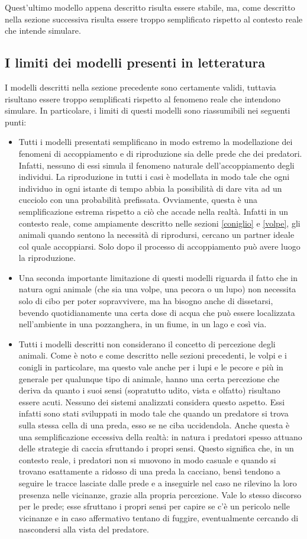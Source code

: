 \documentclass[11pt]{article}
\begin{document}
Quest'ultimo modello appena descritto risulta essere stabile, ma, come descritto nella sezione successiva risulta essere troppo semplificato rispetto al contesto reale che intende simulare. 

\subsection{I limiti dei modelli presenti in letteratura}
I modelli descritti nella sezione precedente sono certamente validi, tuttavia risultano essere troppo semplificati rispetto al fenomeno reale che intendono simulare. 
In particolare, i limiti di questi modelli sono riassumibili nei seguenti punti:
\begin{itemize}
    \item Tutti i modelli presentati semplificano in modo estremo la modellazione dei fenomeni di accoppiamento e di riproduzione sia delle prede che dei predatori. Infatti, nessuno di essi simula il fenomeno naturale dell'accoppiamento degli individui. La riproduzione in tutti i casi è modellata in modo tale che ogni individuo in ogni istante di tempo abbia la possibilità di dare vita ad un cucciolo con una probabilità prefissata. Ovviamente, questa è una semplificazione estrema rispetto a ciò che accade nella realtà. Infatti in un contesto reale, come ampiamente descritto nelle sezioni \ref{coniglio} e \ref{volpe}, gli animali quando sentono la necessità di riprodursi, cercano un partner ideale col quale accoppiarsi. Solo dopo il processo di accoppiamento può avere luogo la riproduzione. 
    \item Una seconda importante limitazione di questi modelli riguarda il fatto che in natura ogni animale (che sia una volpe, una pecora o un lupo) non necessita solo di cibo per poter sopravvivere, ma ha bisogno anche di dissetarsi, bevendo quotidianamente una certa dose di acqua che può essere localizzata nell'ambiente in una pozzanghera, in un fiume, in un lago e così via.
    \item Tutti i modelli descritti non considerano il concetto di percezione degli animali. Come è noto e come descritto nelle sezioni precedenti, le volpi e i conigli in particolare, ma questo vale anche per i lupi e le pecore e più in generale per qualunque tipo di animale, hanno una certa percezione che deriva da quanto i suoi sensi (sopratutto udito, vista e olfatto) risultano essere acuti. Nessuno dei sistemi analizzati considera questo aspetto. Essi infatti sono stati sviluppati in modo tale che quando un predatore si trova sulla stessa cella di una preda, esso se ne ciba uccidendola. Anche questa è una semplificazione eccessiva della realtà: in natura i predatori spesso attuano delle strategie di caccia sfruttando i propri sensi. Questo significa che, in un contesto reale, i predatori non si muovono in modo casuale e quando si trovano esattamente a ridosso di una preda la cacciano, bensì tendono a seguire le tracce lasciate dalle prede e a inseguirle nel caso ne rilevino la loro presenza nelle vicinanze, grazie alla propria percezione. Vale lo stesso discorso per le prede; esse sfruttano i propri sensi per capire se c'è un pericolo nelle vicinanze e in caso affermativo tentano di fuggire, eventualmente cercando di nascondersi alla vista del predatore. 

\end{itemize}
\end{document}
